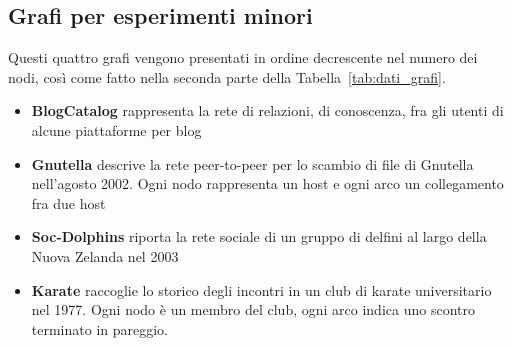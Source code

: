 \subsection*{Grafi per esperimenti minori}
Questi quattro grafi vengono presentati in ordine decrescente nel numero dei nodi, così come fatto nella seconda parte della Tabella~\ref{tab:dati_grafi}.\\
\begin{itemize}
	\item \textbf{BlogCatalog}\cite{BlogCatalog} rappresenta la rete di relazioni, di conoscenza, fra gli utenti di alcune piattaforme per blog
	\item \textbf{Gnutella}\cite{Gnutella_1}\cite{Gnutella_2} descrive la rete peer-to-peer per lo scambio di file di Gnutella nell'agosto 2002. Ogni nodo rappresenta un host e ogni arco un collegamento fra due host
	\item \textbf{Soc-Dolphins}\cite{Dolphins_1}\cite{Dolphins_2} riporta la rete sociale di un gruppo di delfini al largo della Nuova Zelanda nel 2003
	\item \textbf{Karate}\cite{Karate} raccoglie lo storico degli incontri in un club di karate universitario nel 1977. Ogni nodo è un membro del club, ogni arco indica uno scontro terminato in pareggio.
\end{itemize}
%
